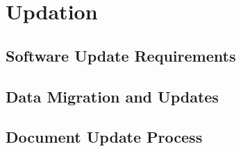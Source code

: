 \documentclass{article}
\begin{document}
\newpage
\section{Updation}
\subsection{Software Update Requirements}

\subsection{Data Migration and Updates}

\subsection{Document Update Process}
\end{document}
